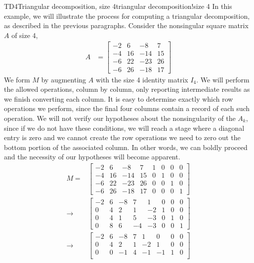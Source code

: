 \begin{example}{TD4}{Triangular decomposition, size 4}{triangular decomposition!size 4}
In this example, we will illustrate the process for computing a triangular decomposition, as described in the previous paragraphs.  Consider the nonsingular square matrix $A$ of size 4,
%
\begin{align*}
A&=
\begin{bmatrix}
 -2 & 6 & -8 & 7 \\
 -4 & 16 & -14 & 15 \\
 -6 & 22 & -23 & 26 \\
 -6 & 26 & -18 & 17
\end{bmatrix}
\end{align*}
%
We form $M$ by augmenting $A$ with the size 4 identity matrix $I_4$.  We will perform the allowed operations, column by column, only reporting intermediate results as we finish converting each column.  It is easy to determine exactly which row operations we perform, since the final four columns contain a record of each such operation.  We will not verify our hypotheses about the nonsingularity of the $A_k$, since if we do not have these conditions, we will reach a stage where a diagonal entry is zero and we cannot create the row operations we need to zero out the bottom portion of the associated column.  In other words, we can boldly proceed and the necessity of our hypotheses will become apparent.
%
\begin{align*}
M=&
\begin{bmatrix}
 -2 & 6 & -8 & 7 & 1 & 0 & 0 & 0 \\
 -4 & 16 & -14 & 15 & 0 & 1 & 0 & 0 \\
 -6 & 22 & -23 & 26 & 0 & 0 & 1 & 0 \\
 -6 & 26 & -18 & 17 & 0 & 0 & 0 & 1
\end{bmatrix}\\
%
\rightarrow&
\begin{bmatrix}
 -2 & 6 & -8 & 7 & 1 & 0 & 0 & 0 \\
 0 & 4 & 2 & 1 & -2 & 1 & 0 & 0 \\
 0 & 4 & 1 & 5 & -3 & 0 & 1 & 0 \\
 0 & 8 & 6 & -4 & -3 & 0 & 0 & 1
\end{bmatrix}\\
%
\rightarrow&
\begin{bmatrix}
 -2 & 6 & -8 & 7 & 1 & 0 & 0 & 0 \\
 0 & 4 & 2 & 1 & -2 & 1 & 0 & 0 \\
 0 & 0 & -1 & 4 & -1 & -1 & 1 & 0 \\

\end{bmatrix}
\end{align*}
\end{example}

